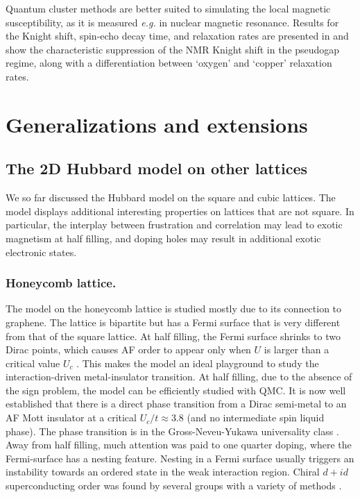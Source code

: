 \documentclass{ar-1col}
\begin{document}
Quantum cluster methods are better suited to simulating the local magnetic susceptibility, as it is measured {\it e.g.} in nuclear magnetic resonance. Results for the Knight shift, spin-echo decay time, and relaxation rates are presented in \cite{Chen17} and show the characteristic suppression of the NMR Knight shift in the pseudogap regime, along with a differentiation between `oxygen' and `copper' relaxation rates.


\section{Generalizations and extensions}
\label{sec:generalizations}
\subsection{The 2D Hubbard model on other lattices}

We so far discussed the Hubbard model on the square and cubic lattices.
The model displays additional interesting properties on lattices that are not square. In particular, the interplay between frustration
and correlation may lead to exotic magnetism at half filling, and doping holes may result in additional exotic electronic states.
%
\subsubsection*{Honeycomb lattice.}The model on the honeycomb lattice is studied mostly due to its connection to graphene. The lattice is bipartite
but has a  Fermi surface that is very different from that of the square lattice. At half filling, the Fermi surface shrinks to two Dirac points, which causes  AF order to appear only when $U$ is larger than a critical value $U_c$ \cite{Sorella92}. 
This makes the model an ideal playground to study the interaction-driven metal-insulator transition. At half filling, due to the absence of the sign problem,
the model can be efficiently studied with QMC. 
It is now well established that there is a direct phase transition from a Dirac semi-metal to an AF Mott insulator
at a critical $U_c / t \approx 3.8$ \cite{Sorella12,Assaad13} (and no intermediate spin liquid phase). The phase transition is in the Gross-Neveu-Yukawa universality class \cite{Assaad13,Otsuka16}. 
Away from half filling, much attention was paid to one quarter doping, where the Fermi-surface has a nesting feature.
Nesting in a Fermi surface usually triggers an instability towards
 an ordered state in the weak interaction region. Chiral $d+id$ superconducting order was found by several groups with a variety of methods \cite{Nandkishore12,Wang12,Gu13}.
%
\end{document}
